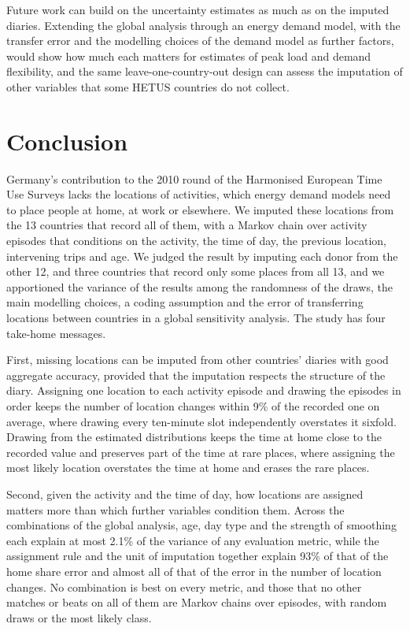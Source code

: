 \documentclass[a4paper]{article}
\begin{document}
Future work can build on the uncertainty estimates as much as on the imputed diaries. Extending the global analysis through an energy demand model, with the transfer error and the modelling choices of the demand model as further factors, would show how much each matters for estimates of peak load and demand flexibility, and the same leave-one-country-out design can assess the imputation of other variables that some HETUS countries do not collect.

\section{Conclusion}
\label{sec:conclusion}

Germany's contribution to the 2010 round of the Harmonised European Time Use Surveys lacks the locations of activities, which energy demand models need to place people at home, at work or elsewhere. We imputed these locations from the 13 countries that record all of them, with a Markov chain over activity episodes that conditions on the activity, the time of day, the previous location, intervening trips and age. We judged the result by imputing each donor from the other 12, and three countries that record only some places from all 13, and we apportioned the variance of the results among the randomness of the draws, the main modelling choices, a coding assumption and the error of transferring locations between countries in a global sensitivity analysis. The study has four take-home messages.

First, missing locations can be imputed from other countries' diaries with good aggregate accuracy, provided that the imputation respects the structure of the diary. Assigning one location to each activity episode and drawing the episodes in order keeps the number of location changes within 9\% of the recorded one on average, where drawing every ten-minute slot independently overstates it sixfold. Drawing from the estimated distributions keeps the time at home close to the recorded value and preserves part of the time at rare places, where assigning the most likely location overstates the time at home and erases the rare places.

Second, given the activity and the time of day, how locations are assigned matters more than which further variables condition them. Across the combinations of the global analysis, age, day type and the strength of smoothing each explain at most 2.1\% of the variance of any evaluation metric, while the assignment rule and the unit of imputation together explain 93\% of that of the home share error and almost all of that of the error in the number of location changes. No combination is best on every metric, and those that no other matches or beats on all of them are Markov chains over episodes, with random draws or the most likely class.
\end{document}
